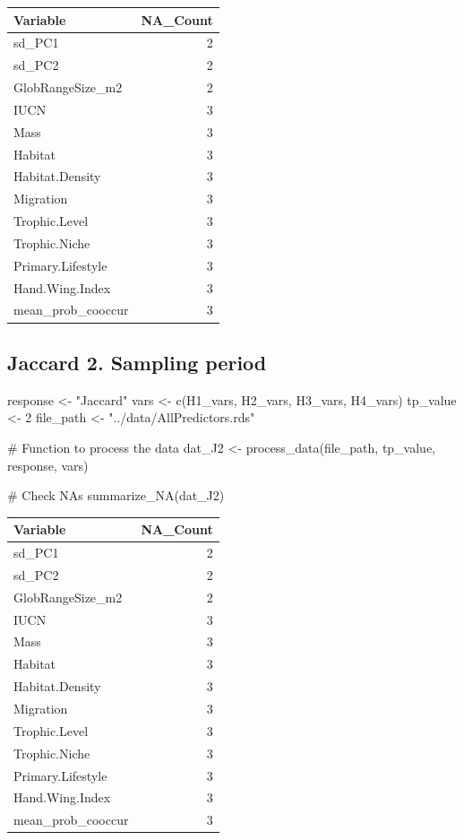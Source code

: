\documentclass[
  letterpaper,
  DIV=11,
  numbers=noendperiod]{scrreprt}
\newenvironment{Shaded}{\begin{snugshade}}{\end{snugshade}}
\newcommand{\CommentTok}[1]{\textcolor[rgb]{0.37,0.37,0.37}{#1}}
\newcommand{\DecValTok}[1]{\textcolor[rgb]{0.68,0.00,0.00}{#1}}
\newcommand{\FunctionTok}[1]{\textcolor[rgb]{0.28,0.35,0.67}{#1}}
\newcommand{\NormalTok}[1]{\textcolor[rgb]{0.00,0.23,0.31}{#1}}
\newcommand{\OtherTok}[1]{\textcolor[rgb]{0.00,0.23,0.31}{#1}}
\newcommand{\StringTok}[1]{\textcolor[rgb]{0.13,0.47,0.30}{#1}}
\begin{document}
\begin{longtable}[]{@{}lr@{}}
\toprule\noalign{}
Variable & NA\_Count \\
\midrule\noalign{}
\endhead
\bottomrule\noalign{}
\endlastfoot
sd\_PC1 & 2 \\
sd\_PC2 & 2 \\
GlobRangeSize\_m2 & 2 \\
IUCN & 3 \\
Mass & 3 \\
Habitat & 3 \\
Habitat.Density & 3 \\
Migration & 3 \\
Trophic.Level & 3 \\
Trophic.Niche & 3 \\
Primary.Lifestyle & 3 \\
Hand.Wing.Index & 3 \\
mean\_prob\_cooccur & 3 \\
\end{longtable}

\subsection{Jaccard 2. Sampling period}

\begin{Shaded}
\begin{Highlighting}[]
\NormalTok{response }\OtherTok{\textless{}{-}} \StringTok{"Jaccard"}
\NormalTok{vars }\OtherTok{\textless{}{-}} \FunctionTok{c}\NormalTok{(H1\_vars, H2\_vars, H3\_vars, H4\_vars)}
\NormalTok{tp\_value }\OtherTok{\textless{}{-}} \DecValTok{2}
\NormalTok{file\_path }\OtherTok{\textless{}{-}} \StringTok{"../data/AllPredictors.rds"}

\CommentTok{\# Function to process the data}
\NormalTok{dat\_J2 }\OtherTok{\textless{}{-}} \FunctionTok{process\_data}\NormalTok{(file\_path, tp\_value, response, vars)}

\CommentTok{\# Check NAs}
\FunctionTok{summarize\_NA}\NormalTok{(dat\_J2)}
\end{Highlighting}
\end{Shaded}

\begin{longtable}[]{@{}lr@{}}
\toprule\noalign{}
Variable & NA\_Count \\
\midrule\noalign{}
\endhead
\bottomrule\noalign{}
\endlastfoot
sd\_PC1 & 2 \\
sd\_PC2 & 2 \\
GlobRangeSize\_m2 & 2 \\
IUCN & 3 \\
Mass & 3 \\
Habitat & 3 \\
Habitat.Density & 3 \\
Migration & 3 \\
Trophic.Level & 3 \\
Trophic.Niche & 3 \\
Primary.Lifestyle & 3 \\
Hand.Wing.Index & 3 \\
mean\_prob\_cooccur & 3 \\
\end{longtable}
\end{document}
